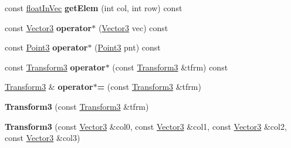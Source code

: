 \begin{DoxyCompactItemize}
\item 
\hypertarget{classVectormath_1_1Aos_1_1Transform3_a8fc4b3fbc0428e8301dc13ee0d952e00}{const \hyperlink{classVectormath_1_1floatInVec}{float\-In\-Vec} {\bfseries get\-Elem} (int col, int row) const }\label{classVectormath_1_1Aos_1_1Transform3_a8fc4b3fbc0428e8301dc13ee0d952e00}

\item 
\hypertarget{classVectormath_1_1Aos_1_1Transform3_ace655e66071f73c7bc3fff36d1579a5d}{const \hyperlink{classVectormath_1_1Aos_1_1Vector3}{Vector3} {\bfseries operator$\ast$} (\hyperlink{classVectormath_1_1Aos_1_1Vector3}{Vector3} vec) const }\label{classVectormath_1_1Aos_1_1Transform3_ace655e66071f73c7bc3fff36d1579a5d}

\item 
\hypertarget{classVectormath_1_1Aos_1_1Transform3_a22f7f7a7286f4e12a11a5d826e9f9506}{const \hyperlink{classVectormath_1_1Aos_1_1Point3}{Point3} {\bfseries operator$\ast$} (\hyperlink{classVectormath_1_1Aos_1_1Point3}{Point3} pnt) const }\label{classVectormath_1_1Aos_1_1Transform3_a22f7f7a7286f4e12a11a5d826e9f9506}

\item 
\hypertarget{classVectormath_1_1Aos_1_1Transform3_a1bfc7ca1bf70a50c7698a6fe3c5ff7f1}{const \hyperlink{classVectormath_1_1Aos_1_1Transform3}{Transform3} {\bfseries operator$\ast$} (const \hyperlink{classVectormath_1_1Aos_1_1Transform3}{Transform3} \&tfrm) const }\label{classVectormath_1_1Aos_1_1Transform3_a1bfc7ca1bf70a50c7698a6fe3c5ff7f1}

\item 
\hypertarget{classVectormath_1_1Aos_1_1Transform3_a8649e20ecbd9824cc0bafcbf28b20464}{\hyperlink{classVectormath_1_1Aos_1_1Transform3}{Transform3} \& {\bfseries operator$\ast$=} (const \hyperlink{classVectormath_1_1Aos_1_1Transform3}{Transform3} \&tfrm)}\label{classVectormath_1_1Aos_1_1Transform3_a8649e20ecbd9824cc0bafcbf28b20464}

\item 
\hypertarget{classVectormath_1_1Aos_1_1Transform3_a77ffda55c385ce413eb6f393485cc168}{{\bfseries Transform3} (const \hyperlink{classVectormath_1_1Aos_1_1Transform3}{Transform3} \&tfrm)}\label{classVectormath_1_1Aos_1_1Transform3_a77ffda55c385ce413eb6f393485cc168}

\item 
\hypertarget{classVectormath_1_1Aos_1_1Transform3_a5ee59b63263a7a38c97a17f1e32a701f}{{\bfseries Transform3} (const \hyperlink{classVectormath_1_1Aos_1_1Vector3}{Vector3} \&col0, const \hyperlink{classVectormath_1_1Aos_1_1Vector3}{Vector3} \&col1, const \hyperlink{classVectormath_1_1Aos_1_1Vector3}{Vector3} \&col2, const \hyperlink{classVectormath_1_1Aos_1_1Vector3}{Vector3} \&col3)}\label{classVectormath_1_1Aos_1_1Transform3_a5ee59b63263a7a38c97a17f1e32a701f}


\end{DoxyCompactItemize}
